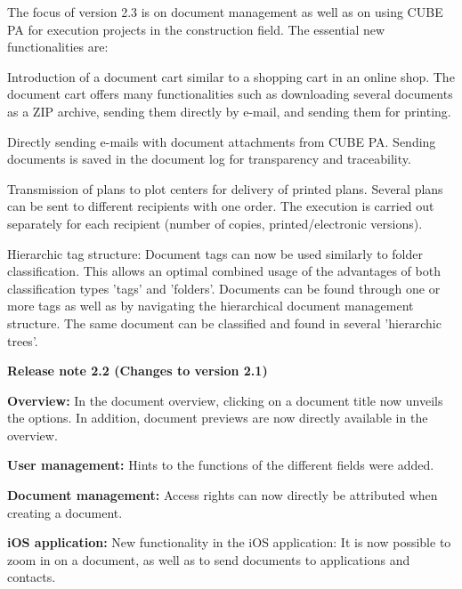 The focus of version 2.3 is on document management as well as on using CUBE PA for execution projects in the construction field. The essential new functionalities are:
\begin{compactitem}
	\item Introduction of a document cart similar to a shopping cart in an online shop. The document cart offers many functionalities such as downloading several documents as a ZIP archive, sending them directly by e-mail, and sending them for printing.
	\item Directly sending e-mails with document attachments from CUBE PA. Sending documents is saved in the document log for transparency and traceability.
	\item Transmission of plans to plot centers for delivery of printed plans. Several plans can be sent to different recipients with one order. The execution is carried out separately for each recipient (number of copies, printed/electronic versions).
	\item Hierarchic tag structure: Document tags can now be used similarly to folder classification. This allows an optimal combined usage of the advantages of both classification types 'tags' and 'folders'. Documents can be found through one or more tags as well as by navigating the hierarchical document management structure. The same document can be classified and found in several 'hierarchic trees'.
\end{compactitem}

\vspace{\baselineskip}

\textbf{Release note 2.2 (Changes to version 2.1)} \\

\begin{compactitem}
	\item \textbf{Overview:} In the document overview, clicking on a document title now unveils the options. In addition, document previews are now directly available in the overview.
	\item \textbf{User management:} Hints to the functions of the different fields were added.
	\item \textbf{Document management:} Access rights can now directly be attributed when creating a document.
	\item \textbf{iOS application:} New functionality in the iOS application: It is now possible to zoom in on a document, as well as to send documents to applications and contacts.
\end{compactitem}

